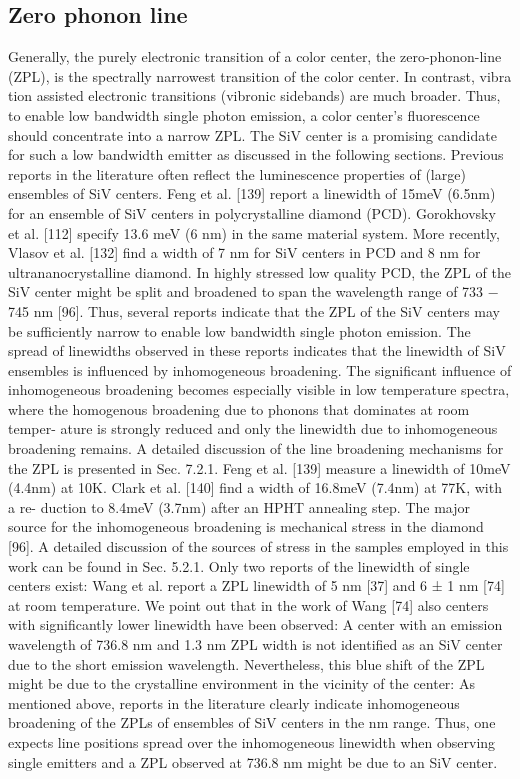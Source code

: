     \subsection{Zero phonon line}

      Generally, the purely electronic transition of a color center, the zero-phonon-line (ZPL), is the spectrally narrowest transition of the color center. In contrast, vibra
      tion assisted electronic transitions (vibronic sidebands) are much broader. Thus, to enable low bandwidth single photon emission, a color center’s fluorescence should concentrate into a narrow ZPL. The SiV center is a promising candidate for such a low bandwidth emitter as discussed in the following sections.
      Previous reports in the literature often reflect the luminescence properties of (large) ensembles of SiV centers. Feng et al. [139] report a linewidth of 15meV (6.5nm) for an ensemble of SiV centers in polycrystalline diamond (PCD). Gorokhovsky et al. [112] specify 13.6 meV (6 nm) in the same material system. More recently, Vlasov et al. [132] find a width of 7 nm for SiV centers in PCD and 8 nm for ultrananocrystalline diamond. In highly stressed low quality PCD, the ZPL of the SiV center might be split and broadened to span the wavelength range of 733 − 745 nm [96]. Thus, several reports indicate that the ZPL of the SiV centers may be sufficiently narrow to enable low bandwidth single photon emission. The spread of linewidths observed in these reports indicates that the linewidth of SiV ensembles is influenced by inhomogeneous broadening. The significant influence of inhomogeneous broadening becomes especially visible in low temperature spectra, where the homogenous broadening due to phonons that dominates at room temper- ature is strongly reduced and only the linewidth due to inhomogeneous broadening remains. A detailed discussion of the line broadening mechanisms for the ZPL is presented in Sec. 7.2.1. Feng et al. [139] measure a linewidth of 10meV (4.4nm) at 10K. Clark et al. [140] find a width of 16.8meV (7.4nm) at 77K, with a re- duction to 8.4meV (3.7nm) after an HPHT annealing step. The major source for the inhomogeneous broadening is mechanical stress in the diamond [96]. A detailed discussion of the sources of stress in the samples employed in this work can be found in Sec. 5.2.1.
      Only two reports of the linewidth of single centers exist: Wang et al. report a ZPL linewidth of 5 nm [37] and 6 ± 1 nm [74] at room temperature. We point out that in the work of Wang [74] also centers with significantly lower linewidth have been observed: A center with an emission wavelength of 736.8 nm and 1.3 nm ZPL width is not identified as an SiV center due to the short emission wavelength. Nevertheless, this blue shift of the ZPL might be due to the crystalline environment in the vicinity of the center: As mentioned above, reports in the literature clearly indicate inhomogeneous broadening of the ZPLs of ensembles of SiV centers in the nm range. Thus, one expects line positions spread over the inhomogeneous linewidth when observing single emitters and a ZPL observed at 736.8 nm might be due to an SiV center.
